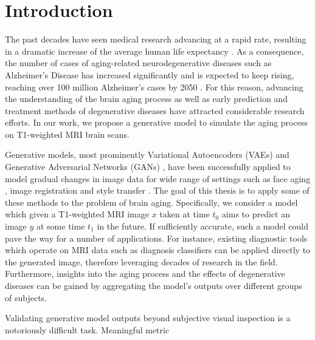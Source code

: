 \chapter{Introduction}




The past decades have seen medical research advancing at a rapid rate, resulting in a dramatic increase of the average human life expectancy \cite{owidlifeexpectancy}. As a consequence, the number of cases of aging-related neurodegenerative diseases such as Alzheimer's Disease has increased significantly and is expected to keep rising, reaching over 100 million Alzheimer's cases by 2050 \cite{brookmeyer2007forecasting}. For this reason, advancing the understanding of the brain aging process as well as early prediction and treatment methods of degenerative diseases have attracted considerable research efforts. In our work, we propose a generative model to simulate the aging process on T1-weighted MRI brain scans.%

Generative models, most prominently Variational Autoencoders (VAEs) \cite{kingma2013auto} and Generative Adversarial Networks (GANs) \cite{goodfellow2014generative}, have been successfully applied to model gradual changes in image data for wide range of settings such as face aging \cite{palsson2018generative}, image registration \cite{balakrishnan2019voxelmorph} and style transfer \cite{zhu2017unpaired}. The goal of this thesis is to apply some of these methods to the problem of brain aging. Specifically, we consider a model which given a T1-weighted MRI image $x$ taken at time $t_0$ aims to predict an image $y$ at some time $t_1$ in the future. If sufficiently accurate, such a model could pave the way for a number of applications. For instance, existing diagnostic tools which operate on MRI data such as diagnosis classifiers can be applied directly to the generated image, therefore leveraging decades of research in the field. Furthermore, insights into the aging process and the effects of degenerative diseases can be gained by aggregating the model's outputs over different groups of subjects.

Validating generative model outputs beyond subjective visual inspection is a notoriously difficult task. 
Meaningful metric


